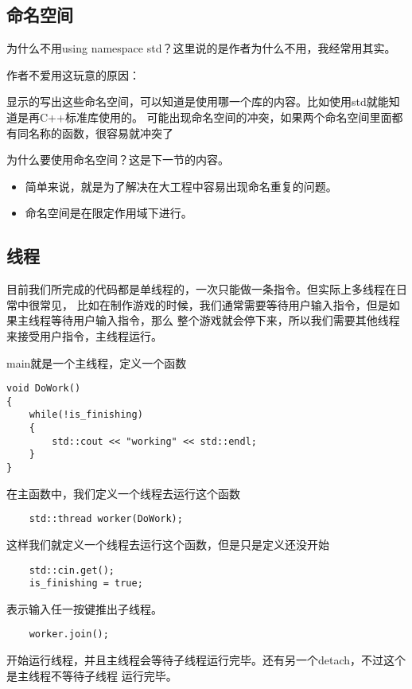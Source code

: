 \documentclass{article}
\begin{document}
\begin{sloppypar}
\subsection{命名空间}
为什么不用using namespace std？这里说的是作者为什么不用，我经常用其实。

作者不爱用这玩意的原因：
\begin{outline}
	\1 显示的写出这些命名空间，可以知道是使用哪一个库的内容。比如使用std就能知道是再C++标准库使用的。
	\1 可能出现命名空间的冲突，如果两个命名空间里面都有同名称的函数，很容易就冲突了
\end{outline}

为什么要使用命名空间？这是下一节的内容。
\begin{itemize}
	\item 简单来说，就是为了解决在大工程中容易出现命名重复的问题。
	\item 命名空间是在限定作用域下进行。
\end{itemize}

\subsection{线程}
目前我们所完成的代码都是单线程的，一次只能做一条指令。但实际上多线程在日常中很常见，
比如在制作游戏的时候，我们通常需要等待用户输入指令，但是如果主线程等待用户输入指令，那么
整个游戏就会停下来，所以我们需要其他线程来接受用户指令，主线程运行。

main就是一个主线程，定义一个函数
\begin{lstlisting}
void DoWork()
{
    while(!is_finishing)
    {
        std::cout << "working" << std::endl;
    }
}
\end{lstlisting}
在主函数中，我们定义一个线程去运行这个函数
\begin{lstlisting}
	std::thread worker(DoWork);
\end{lstlisting}
这样我们就定义一个线程去运行这个函数，但是只是定义还没开始
\begin{lstlisting}
	std::cin.get();
    is_finishing = true;
\end{lstlisting}
表示输入任一按键推出子线程。
\begin{lstlisting}
	worker.join();
\end{lstlisting}
开始运行线程，并且主线程会等待子线程运行完毕。还有另一个detach，不过这个是主线程不等待子线程
运行完毕。


\end{sloppypar}
\end{document}
